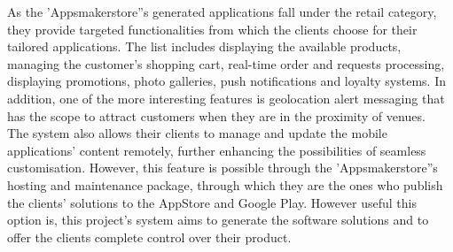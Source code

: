 As the 'Appsmakerstore''s generated applications fall under the retail category, they provide targeted functionalities from which the clients choose for their tailored applications. The list includes displaying the available products, managing the customer's shopping cart, real-time order and requests processing, displaying promotions, photo galleries, push notifications and loyalty systems. In addition, one of the more interesting features is geolocation alert messaging that has the scope to attract customers when they are in the proximity of venues.\\

The system also allows their clients to manage and update the mobile applications' content remotely, further enhancing the possibilities of seamless customisation. However, this feature is possible through the 'Appsmakerstore''s hosting and maintenance package, through which they are the ones who publish the clients' solutions to the AppStore and Google Play. However useful this option is, this project's system aims to generate the software solutions and to offer the clients complete control over their product.